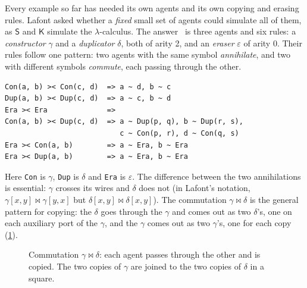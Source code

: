 \documentclass[11pt,a4paper]{article}
\newcommand{\ag}[1]{\mathsf{#1}}
\newcommand{\act}{\mathrel{\bowtie}}
\newcommand{\Up}[5][]{%
  \node[agent,#1] (#2) at (#3) {#4};
  \coordinate (#2-0) at (#2.corner 1);
  \ifnum#5=1 \coordinate (#2-1) at ($(#2.corner 2)!.5!(#2.corner 3)$);\fi
  \ifnum#5=2 \coordinate (#2-1) at ($(#2.corner 2)!.27!(#2.corner 3)$);
    \coordinate (#2-2) at ($(#2.corner 2)!.73!(#2.corner 3)$);\fi
  \node[pp] at (#2-0) {};}
\newcommand{\Down}[5][]{%
  \node[agent,regular polygon rotate=180,#1] (#2) at (#3) {#4};
  \coordinate (#2-0) at (#2.corner 1);
  \ifnum#5=1 \coordinate (#2-1) at ($(#2.corner 3)!.5!(#2.corner 2)$);\fi
  \ifnum#5=2 \coordinate (#2-1) at ($(#2.corner 3)!.27!(#2.corner 2)$);
    \coordinate (#2-2) at ($(#2.corner 3)!.73!(#2.corner 2)$);\fi
  \node[pp] at (#2-0) {};}
\newcommand{\ruleto}[1]{\node[font=\Large] at (#1) {$\Rightarrow$};}
\theoremstyle{definition}
\theoremstyle{plain}
\begin{document}
Every example so far has needed its own agents and its own copying and
erasing rules. Lafont asked whether a \emph{fixed} small set of agents could
simulate all of them, as $\ag{S}$ and $\ag{K}$ simulate the
$\lambda$-calculus. The answer~\cite{lafont97} is three agents and six rules:
a \emph{constructor} $\gamma$ and a \emph{duplicator} $\delta$, both of arity
2, and an \emph{eraser} $\varepsilon$ of arity 0. Their rules follow one
pattern: two agents with the same symbol \emph{annihilate}, and two with
different symbols \emph{commute}, each passing through the other.
\begin{lstlisting}
Con(a, b) >< Con(c, d)  => a ~ d, b ~ c
Dup(a, b) >< Dup(c, d)  => a ~ c, b ~ d
Era >< Era              =>
Con(a, b) >< Dup(c, d)  => a ~ Dup(p, q), b ~ Dup(r, s),
                           c ~ Con(p, r), d ~ Con(q, s)
Era >< Con(a, b)        => a ~ Era, b ~ Era
Era >< Dup(a, b)        => a ~ Era, b ~ Era
\end{lstlisting}
Here \texttt{Con} is $\gamma$, \texttt{Dup} is $\delta$ and \texttt{Era} is
$\varepsilon$. The difference between the two annihilations is essential:
$\gamma$ crosses its wires and $\delta$ does not (in Lafont's notation,
$\gamma[x,y] \act \gamma[y,x]$ but $\delta[x,y]\act\delta[x,y]$). The
commutation $\gamma \act \delta$ is the general pattern for copying: the
$\delta$ goes through the $\gamma$ and comes out as two $\delta$'s, one on
each auxiliary port of the $\gamma$, and the $\gamma$ comes out as two
$\gamma$'s, one for each copy (\cref{fig:comm}).

\begin{figure}[t]
\centering
{}
\caption{Commutation $\gamma\act\delta$: each agent passes through the other
and is copied. The two copies of $\gamma$ are joined to the two copies of
$\delta$ in a square.}
\label{fig:comm}
\end{figure}
\end{document}
